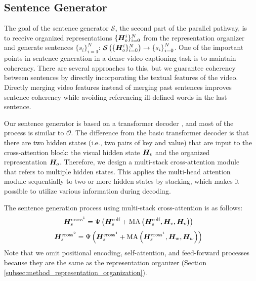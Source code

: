 \subsection{Sentence Generator}
\label{subsec:method-sentence_generator}
The goal of the sentence generator $\mathcal{S}$, the second part of the parallel pathway, is to receive organized representations $\{\bm{H}_o^i\}_{i=0}^{N}$ from the representation organizer and generate sentences ${\{s_i\}}_{i=0}^{N}$: $\mathcal{S}\left({\{\bm{H}_o^i\}_{i=0}^{N}}\right) \rightarrow {\{s_i\}}_{i=0}^{N}$.
One of the important points in sentence generation in a dense video captioning task is to maintain coherency.
There are several approaches to this, but we guarantee coherency between sentences by directly incorporating the textual features of the video.
Directly merging video features instead of merging past sentences improves sentence coherency while avoiding referencing ill-defined words in the last sentence.

Our sentence generator is based on a transformer decoder \cite{vaswani2017attention}, and most of the process is similar to $\mathcal{O}$.
The difference from the basic transformer decoder is that there are two hidden states (i.e., two pairs of key and value) that are input to the cross-attention block: the visual hidden state $\bm{H}_v$ and the organized representation $\bm{H}_o$.
Therefore, we design a multi-stack cross-attention module that refers to multiple hidden states.
This applies the multi-head attention module sequentially to two or more hidden states by stacking, which makes it possible to utilize various information during decoding.

The sentence generation process using multi-stack cross-attention is as follows:
\begin{equation}
  \bm{H}_s^{\text{cross}^1} = \Psi \left( \bm{H}_s^{\text{self}} + \text{MA} \left( \bm{H}_s^{\text{self}}, \bm{H}_{v}, \bm{H}_{v} \right) \right)
  \label{eq:setence_constructor_cross1_attention}
\end{equation}
\begin{equation}
  \bm{H}_s^{\text{cross}^2} = \Psi \left( \bm{H}_s^{\text{cross}^1} + \text{MA} \left( \bm{H}_s^{\text{cross}^1}, \bm{H}_{w}, \bm{H}_{w} \right) \right)
  \label{eq:setence_constructor_cross2_attention}
\end{equation}
Note that we omit positional encoding, self-attention, and feed-forward processes because they are the same as the representation organizer (Section \ref{subsec:method_representation_organization}).


